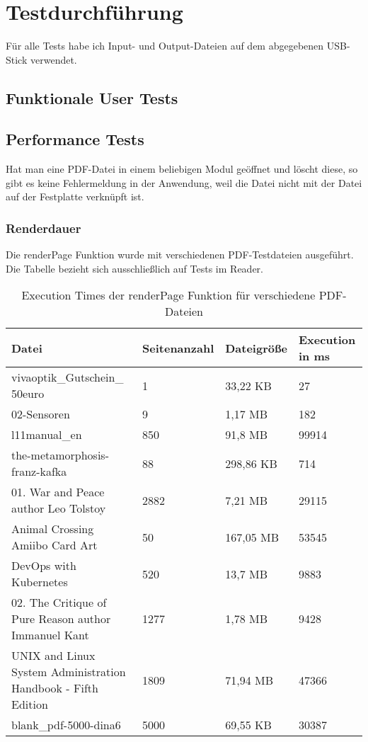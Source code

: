 \section{Testdurchführung}
Für alle Tests habe ich Input- und Output-Dateien auf dem abgegebenen USB-Stick verwendet.

\subsection{Funktionale User Tests}

\subsection{Performance Tests}
Hat man eine PDF-Datei in einem beliebigen Modul geöffnet und löscht diese, so gibt es keine Fehlermeldung in der Anwendung, weil die Datei nicht mit der Datei auf der Festplatte verknüpft ist. 

\subsubsection{Renderdauer}
Die renderPage Funktion wurde mit verschiedenen PDF-Testdateien ausgeführt. Die Tabelle bezieht sich ausschließlich auf Tests im Reader. 

\begin{table}[!htbp]
	\centering
	\begin{tabular}{|p{4cm}|p{3cm}|p{3cm}|p{3cm}|}
		\hline
		\textbf{Datei}													& \textbf{Seitenanzahl} 	& \textbf{Dateigröße} 	& \textbf{Execution in ms}	\\ 
		\hline
		\parbox[t]{4cm}{vivaoptik\_Gutschein\_\\50euro}					& 1 						& 33,22 KB  			& 27						\\ 
		02-Sensoren														& 9 						& 1,17 MB  				& 182						\\ 
		l11manual\_en 													& 850 						& 91,8 MB  				& 99914						\\
		the-metamorphosis-franz-kafka 									& 88 						& 298,86 KB  			& 714						\\ 
		01. War and Peace author Leo Tolstoy 							& 2882 						& 7,21 MB  				& 29115						\\ 
		Animal Crossing Amiibo Card Art									& 50 						& 167,05 MB  			& 53545						\\  
		DevOps with Kubernetes											& 520 						& 13,7 MB  				& 9883						\\  
		02. The Critique of Pure Reason author Immanuel Kant			& 1277 						& 1,78 MB  				& 9428						\\  
		UNIX and Linux System Administration Handbook - Fifth Edition	& 1809						& 71,94 MB  			& 47366						\\ 
		blank\_pdf-5000-dina6											& 5000						& 69,55 KB  			& 30387						\\ 
		\hline
	\end{tabular}
	\caption{Execution Times der renderPage Funktion für verschiedene PDF-Dateien}
	\label{table:render-dur}
\end{table}

